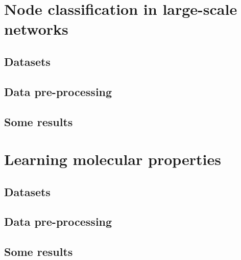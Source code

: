 \documentclass[12pt]{article}
\begin{document}
\clearpage

\section{Node classification in large-scale networks}

\subsection{Datasets}

\subsection{Data pre-processing}

\subsection{Some results}

\clearpage

\section{Learning molecular properties}

\subsection{Datasets}

\subsection{Data pre-processing}

\subsection{Some results}

\clearpage


{\small

}

\clearpage

\listoffigures
\end{document}
